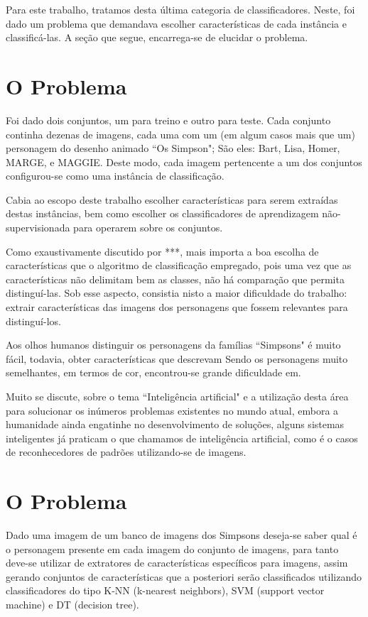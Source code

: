 \documentclass[12pt]{article}
\begin{document}
	Para este trabalho, tratamos desta última categoria de classificadores. Neste, foi dado um problema que demandava escolher características de cada instância e classificá-las. A seção que segue, encarrega-se de elucidar o problema.


\section{O Problema}\label{sec:problema}

	Foi dado dois conjuntos, um para treino e outro para teste. Cada conjunto continha dezenas de imagens, cada uma com um (em algum casos mais que um) personagem do desenho animado ``Os Simpson"; São eles: Bart, Lisa, Homer, MARGE, e MAGGIE. Deste modo, cada imagem pertencente a um dos conjuntos configurou-se como uma instância de classificação.

	Cabia ao escopo deste trabalho escolher características para serem extraídas destas instâncias, bem como escolher os classificadores de aprendizagem não-supervisionada para operarem sobre os conjuntos.

	Como exaustivamente discutido por ***, mais importa a boa escolha de características que o algoritmo de classificação empregado, pois uma vez que as características não delimitam bem as classes, não há comparação que permita distinguí-las. Sob esse aspecto, consistia nisto a maior dificuldade do trabalho: extrair características das imagens dos personagens que fossem relevantes para distinguí-los.

	Aos olhos humanos distinguir os personagens da famílias ``Simpsons" é muito fácil, todavia, obter características que descrevam Sendo os personagens muito semelhantes, em termos de cor, encontrou-se grande dificuldade em.

	Muito se discute, sobre o tema ``Inteligência artificial" e a utilização desta área para solucionar os inúmeros problemas existentes no mundo atual, embora a humanidade ainda engatinhe no desenvolvimento de soluções, alguns sistemas inteligentes já praticam o que chamamos de inteligência artificial, como é o casos de reconhecedores de padrões utilizando-se de imagens.

\section{O Problema}\label{sec:problema}

	Dado uma imagem de um banco de imagens dos Simpsons deseja-se saber qual é o personagem presente em cada imagem do conjunto de imagens, para tanto deve-se utilizar de extratores de características específicos para imagens, assim gerando conjuntos de características que a posteriori serão classificados utilizando classificadores do tipo K-NN (k-nearest neighbors), SVM (support vector machine) e DT (decision tree).
\end{document}
